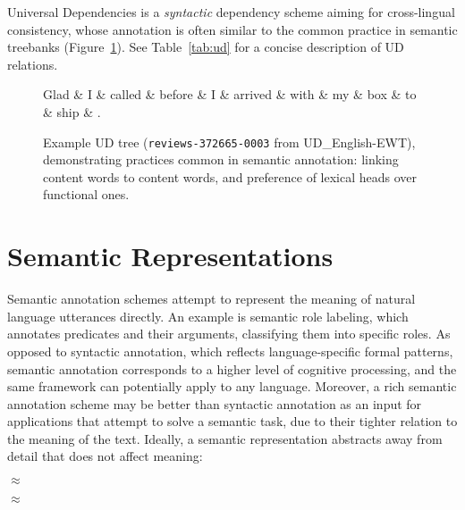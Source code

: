 \documentclass[12pt,a4paper,table]{report}
\newcommand{\heb}[1]{\bgroup\textdir TRT\hebfont #1\egroup}
\begin{document}
Universal Dependencies \citep{nivre2016universal}
is a \textit{syntactic} dependency scheme aiming for cross-lingual consistency,
whose annotation is often similar to the common practice in semantic treebanks
(Figure~\ref{fig:original_example_ud}).
See Table~\ref{tab:ud} for a concise description of UD relations.

\begin{figure}[t]
  \centering
    \begin{dependency}[text only label, label style={above,font=\tt}, font=\small]
    \begin{deptext}[column sep=.8em]
    Glad \& I    \& called \& before \& I    \& arrived \& with \& my   \& box  \& to   \& ship \& . \\
    \end{deptext}
    \end{dependency}
\caption{Example UD tree (\texttt{reviews-372665-0003} from UD\_English-EWT), demonstrating practices common in semantic annotation:
linking content words to content words, and preference of lexical heads over functional ones.
\label{fig:original_example_ud}}
\end{figure}

\section{Semantic Representations}\label{sec:intro_semantic_reps}

Semantic annotation schemes attempt to represent the meaning of natural
language utterances directly. An example is semantic role
labeling, which annotates
predicates and their arguments, classifying them into specific roles. As
opposed to syntactic annotation, which reflects language-specific formal
patterns, semantic annotation corresponds to a higher level of cognitive
processing, and the same framework can potentially apply to any language.
Moreover, a rich semantic annotation scheme may be better than
syntactic annotation as an input for applications that attempt to solve a
semantic task, due to their tighter relation to the meaning of the text.
Ideally, a semantic representation abstracts away from detail that does not affect meaning:

\begin{center}
     $\approx$ 
    
     $\approx$ \fbox{\heb{סיים את הלימודים}}
\end{center}
\end{document}
